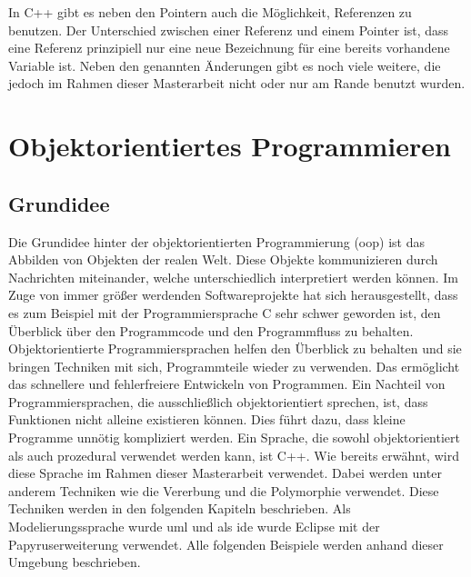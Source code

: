 In C++ gibt es neben den Pointern auch die Möglichkeit, Referenzen zu benutzen. Der Unterschied zwischen einer Referenz und einem Pointer ist, dass eine Referenz prinzipiell nur eine neue Bezeichnung für eine bereits vorhandene Variable ist.  Neben den genannten Änderungen gibt es noch viele weitere, die jedoch im Rahmen dieser Masterarbeit nicht oder nur am Rande benutzt wurden.   
\\
\cite{SebastianMeyer.}
\cite{Krau.}
\cite{Prof.Dr.Ing.WolfgangSchroderPreikschat.}
\cite{HelmutErlenkotter.}
\cite{BenjaminBuch.}
\section{Objektorientiertes Programmieren }

\subsection{Grundidee }
Die Grundidee hinter der objektorientierten Programmierung (\acs{oop}) ist das Abbilden von Objekten der realen Welt. Diese Objekte kommunizieren durch Nachrichten miteinander, welche unterschiedlich interpretiert werden können.  Im Zuge von immer größer werdenden Softwareprojekte hat sich herausgestellt, dass es zum Beispiel mit der Programmiersprache C sehr schwer geworden ist, den  Überblick über den Programmcode und den Programmfluss zu behalten. Objektorientierte Programmiersprachen helfen den Überblick zu behalten und sie bringen Techniken mit sich, Programmteile wieder zu verwenden. Das ermöglicht  das schnellere und fehlerfreiere Entwickeln von Programmen. Ein Nachteil von Programmiersprachen, die ausschließlich objektorientiert sprechen, ist, dass Funktionen nicht alleine existieren können. Dies führt dazu, dass kleine Programme unnötig kompliziert werden. Ein Sprache, die sowohl objektorientiert als auch prozedural verwendet werden kann, ist C++. Wie bereits erwähnt, wird diese Sprache im Rahmen dieser Masterarbeit verwendet.    
Dabei werden unter anderem  Techniken wie die Vererbung und die Polymorphie verwendet. Diese Techniken werden in den folgenden Kapiteln beschrieben. Als Modelierungssprache wurde \ac{uml} und als \ac{ide} wurde Eclipse mit der Papyruserweiterung verwendet. Alle folgenden Beispiele werden anhand dieser Umgebung beschrieben. \\
\cite{HelmutErlenkotter.}
\cite{Prof.Dr.AlfredIrber.}
\cite{Krau.}

